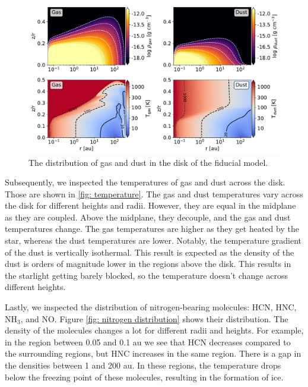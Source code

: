 \documentclass[oneside, single, authoryear, semicolon]{lion-msc}
\newcommand{\4}{$_4$}
\newcommand{\3}{$_3$}
\newcommand{\2}{$_2$}
\begin{document}
\begin{figure}[!ht]
    \centering
    \includegraphics[width=\linewidth]{Figures/DensityTemperature.pdf}
    \caption{The distribution of gas and dust in the disk of the fiducial model.}
    \label{fig: density}
\end{figure}

Subsequently, we inspected the temperatures of gas and dust across the disk. Those are shown in \autoref{fig: temperature}.  The gas and dust temperatures vary across the disk for different heights and radii. However, they are equal in the midplane as they are coupled. Above the midplane, they decouple, and the gas and dust temperatures change. The gas temperatures are higher as they get heated by the star, whereas the dust temperatures are lower. Notably, the temperature gradient of the dust is vertically isothermal. This result is expected as the density of the dust is orders of magnitude lower in the regions above the disk. This results in the starlight getting barely blocked, so the temperature doesn't change across different heights.


Lastly, we inspected the distribution of nitrogen-bearing molecules: HCN, HNC, NH\3, and NO. Figure \autoref{fig: nitrogen distribution} shows their distribution. The density of the molecules changes a lot for different radii and heights. For example, in the region between 0.05 and 0.1 au we see that HCN decreases compared to the surrounding regions, but HNC increases in the same region. There is a gap in the densities between 1 and 200 au. In these regions, the temperature drops below the freezing point of these molecules, resulting in the formation of ice. 
\end{document}
